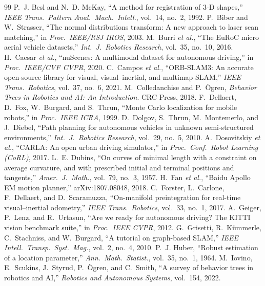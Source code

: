 \documentclass[11pt,a4paper]{article}
\begin{document}
\begin{thebibliography}{99}\small\setlength{\itemsep}{1pt}
 P.~J. Besl and N.~D. McKay, ``A method for registration of 3-D shapes,'' \emph{IEEE Trans.\ Pattern Anal.\ Mach.\ Intell.}, vol.~14, no.~2, 1992.
 P.~Biber and W.~Strasser, ``The normal distributions transform: A new approach to laser scan matching,'' in \emph{Proc.\ IEEE/RSJ IROS}, 2003.
 M.~Burri \emph{et al.}, ``The EuRoC micro aerial vehicle datasets,'' \emph{Int.\ J.\ Robotics Research}, vol.~35, no.~10, 2016.
 H.~Caesar \emph{et al.}, ``nuScenes: A multimodal dataset for autonomous driving,'' in \emph{Proc.\ IEEE/CVF CVPR}, 2020.
 C.~Campos \emph{et al.}, ``ORB-SLAM3: An accurate open-source library for visual, visual--inertial, and multimap SLAM,'' \emph{IEEE Trans.\ Robotics}, vol.~37, no.~6, 2021.
 M.~Colledanchise and P.~{\"O}gren, \emph{Behavior Trees in Robotics and AI: An Introduction}. CRC Press, 2018.
 F.~Dellaert, D.~Fox, W.~Burgard, and S.~Thrun, ``Monte Carlo localization for mobile robots,'' in \emph{Proc.\ IEEE ICRA}, 1999.
 D.~Dolgov, S.~Thrun, M.~Montemerlo, and J.~Diebel, ``Path planning for autonomous vehicles in unknown semi-structured environments,'' \emph{Int.\ J.\ Robotics Research}, vol.~29, no.~5, 2010.
 A.~Dosovitskiy \emph{et al.}, ``CARLA: An open urban driving simulator,'' in \emph{Proc.\ Conf.\ Robot Learning (CoRL)}, 2017.
 L.~E. Dubins, ``On curves of minimal length with a constraint on average curvature, and with prescribed initial and terminal positions and tangents,'' \emph{Amer.\ J.\ Math.}, vol.~79, no.~3, 1957.
 H.~Fan \emph{et al.}, ``Baidu Apollo EM motion planner,'' arXiv:1807.08048, 2018.
 C.~Forster, L.~Carlone, F.~Dellaert, and D.~Scaramuzza, ``On-manifold preintegration for real-time visual--inertial odometry,'' \emph{IEEE Trans.\ Robotics}, vol.~33, no.~1, 2017.
 A.~Geiger, P.~Lenz, and R.~Urtasun, ``Are we ready for autonomous driving? The KITTI vision benchmark suite,'' in \emph{Proc.\ IEEE CVPR}, 2012.
 G.~Grisetti, R.~K{\"u}mmerle, C.~Stachniss, and W.~Burgard, ``A tutorial on graph-based SLAM,'' \emph{IEEE Intell.\ Transp.\ Syst.\ Mag.}, vol.~2, no.~4, 2010.
 P.~J. Huber, ``Robust estimation of a location parameter,'' \emph{Ann.\ Math.\ Statist.}, vol.~35, no.~1, 1964.
 M.~Iovino, E.~Scukins, J.~Styrud, P.~{\"O}gren, and C.~Smith, ``A survey of behavior trees in robotics and AI,'' \emph{Robotics and Autonomous Systems}, vol.~154, 2022.

\end{thebibliography}
\end{document}
